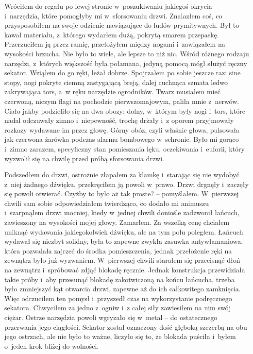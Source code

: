 Wróciłem do regału po lewej stronie w~poszukiwaniu jakiegoś okrycia i~narzędzia, które pomogłyby mi w~sforsowaniu drzwi. Znalazłem coś, co przysposobiłem na swoje odzienie nawiązujące do ludów prymitywnych. Był to kawał materiału, z~którego wydarłem dużą, pokrytą smarem przepaskę. Przerzuciłem ją przez ramię, przełożyłem między nogami i~zawiązałem na wysokości brzucha. Nie było to wiele, ale lepsze to niż nic. Wśród różnego rodzaju narzędzi, z~których większość była połamana, jedyną pomocą mógł służyć ręczny sekator. Wziąłem do go ręki, leżał dobrze. Spojrzałem po sobie jeszcze raz: sine stopy, nogi pokryte ciemną zastygającą breją, dalej cuchnąca szmata ledwo zakrywająca tors, a~w ręku narzędzie ogrodników. Twarz musiałem mieć czerwoną, niczym flagi na pochodzie pierwszomajowym, paliła mnie z~nerwów. Ciało jakby podzieliło się na dwa obozy: dolny, w~którym były nogi i~tors, które nadal odczuwały zimno i~niepewność, trochę drżały i~z oporem przyjmowały rozkazy wydawane im przez głowę. Górny obóz, czyli właśnie głowa, pulsowała jak czerwona żarówka podczas alarmu bombowego w~schronie. Było mi gorąco i~zimno zarazem, specyficzny stan pomieszania lęku, oczekiwania i~euforii, który wyzwolił się na chwilę przed próbą sforsowania drzwi.

Podszedłem do drzwi, ostrożnie złapałem za klamkę i~starając się nie wydobyć z~niej żadnego dźwięku, przekręciłem ją powoli w~prawo. Drzwi drgnęły i~zaczęły się powoli otwierać. Czyżby to było aż tak proste? -- pomyślałem. W~pierwszej chwili sam sobie odpowiedziałem twierdząco, co dodało mi animuszu i~szarpnąłem drzwi mocniej, kiedy w~jednej chwili doniośle zadzwonił łańcuch, zawieszony na wysokości mojej głowy. Zamarłem. Za wszelką cenę chciałem uniknąć wydawania jakiegokolwiek dźwięku, ale na tym polu poległem. Łańcuch wydawał się niezbyt solidny, była to zapewne zwykła zasuwka antywłamaniowa, która pozwalała zajrzeć do środka pomieszczenia, jednak przełożenie ręki na zewnątrz było już wyzwaniem. W~pierwszej chwili starałem się przecisnąć dłoń na zewnątrz i~spróbować zdjąć blokadę ręcznie. Jednak konstrukcja przewidziała takie próby i~aby przesunąć blokadę zakotwiczoną na końcu łańcucha, trzeba było zmniejszyć kąt otwarcia drzwi, zapewne aż do ich całkowitego zamknięcia. Więc odrzuciłem ten pomysł i~przyszedł czas na wykorzystanie podręcznego sekatora. Chwyciłem za jedno z~ogniw i~z całej siły zawiesiłem na nim swój ciężar. Ostrze narzędzia powoli wgryzało się w~metal -- do ostatecznego przerwania jego ciągłości. Sekator został oznaczony dość głęboką szczerbą na obu jego ostrzach, ale nie było to ważne, liczyło się to, że blokada puściła i~byłem o~jeden krok bliżej do wolności.

